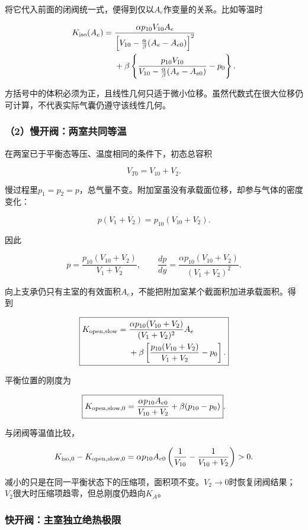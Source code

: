 \documentclass[12pt,a4paper,fontset=fandol]{ctexart}
\begin{document}
将它代入前面的闭阀统一式，便得到仅以\(A_e\)作变量的关系。比如等温时

\[
\begin{aligned}
K_{\rm iso}(A_e)
={}&\frac{\alpha p_{10}V_{10}A_e}
{\left[V_{10}-\frac{\alpha}{\beta}
(A_e-A_{e0})\right]^2}\\
&+\beta\left\{
\frac{p_{10}V_{10}}
{V_{10}-\frac{\alpha}{\beta}(A_e-A_{e0})}-p_0
\right\}.
\end{aligned}
\]

方括号中的体积必须为正，且线性几何只适于微小位移。虽然代数式在很大位移仍可计算，不代表实际气囊仍遵守该线性几何。

\subsubsection{（2）慢开阀：两室共同等温}\label{ux6162ux5f00ux9600ux4e24ux5ba4ux5171ux540cux7b49ux6e29}

在两室已于平衡态等压、温度相同的条件下，初态总容积

\[
V_{T0}=V_{10}+V_2.
\]

慢过程里\(p_1=p_2=p\)，总气量不变。附加室虽没有承载面位移，却参与气体的密度变化：

\[
p(V_1+V_2)=p_{10}(V_{10}+V_2).
\]

因此

\[
p=\frac{p_{10}(V_{10}+V_2)}{V_1+V_2},
\qquad
\frac{dp}{dy}
=\frac{\alpha p_{10}(V_{10}+V_2)}
{(V_1+V_2)^2}.
\]

向上支承仍只有主室的有效面积\(A_e\)，不能把附加室某个截面积加进承载面积。得到

\[
\boxed{
\begin{aligned}
K_{\rm open,slow}
={}&\frac{\alpha p_{10}(V_{10}+V_2)}
{(V_1+V_2)^2}A_e\\
&+\beta\left[
\frac{p_{10}(V_{10}+V_2)}
{V_1+V_2}-p_0\right].
\end{aligned}}
\]

平衡位置的刚度为

\[
\boxed{
K_{{\rm open,slow},0}
=\frac{\alpha p_{10}A_{e0}}{V_{10}+V_2}
+\beta(p_{10}-p_0)}.
\]

与闭阀等温值比较，

\[
K_{{\rm iso},0}-K_{{\rm open,slow},0}
=\alpha p_{10}A_{e0}
\left(\frac1{V_{10}}-\frac1{V_{10}+V_2}\right)>0.
\]

减小的只是在同一平衡状态下的压缩项，面积项不变。\(V_2\to0\)时恢复闭阀结果；\(V_2\)很大时压缩项趋零，但总刚度仍趋向\(K_A\)。

\subsubsection{快开阀：主室独立绝热极限}\label{ux5febux5f00ux9600ux4e3bux5ba4ux72ecux7acbux7eddux70edux6781ux9650}
\end{document}
